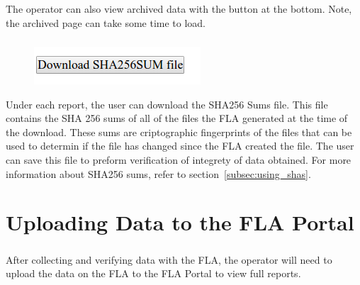 \documentclass[11pt, oneside]{book}
\begin{document}
\paragraph{  }
The operator can also view archived data with the button at the bottom. Note, the archived page can take some time to load.
\paragraph{  }
\begin{figure}
\centering
\includegraphics[width=1\linewidth]{../media/fla_preview_screenshots/download_sha_button}
\end{figure}
Under each report, the user can download the SHA256 Sums file.
This file contains the SHA 256 sums of all of the files the FLA generated at the time of the download. These sums are criptographic fingerprints of the files that can be used to determin if the file has changed since the FLA created the file. The user can save this file to preform verification of integrety of data obtained. For more information about SHA256 sums, refer to section~\ref{subsec:using_shas}.

\chapter{Uploading Data to the FLA Portal}
\paragraph{  }
After collecting and verifying data with the FLA, the operator will need to upload the data on the FLA to the FLA Portal to view full reports.
\end{document}
